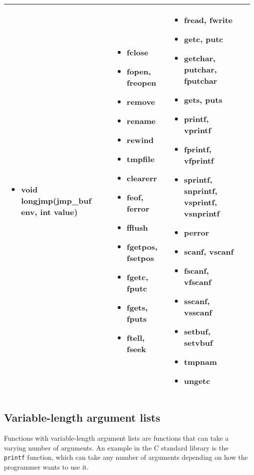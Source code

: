 \begin{table*}[h]
\begin{tabular}{|p{3cm}|p{3cm}|p{3cm}|p{6.5cm}|}
\begin{itemize}
	\item void longjmp(jmp\_buf env, int value)
\end{itemize}
 &  \begin{itemize}
\setlength{\itemsep}{0cm}
\setlength{\parskip}{0cm}
	\item fclose
	\item fopen, freopen
	\item remove
	\item rename
	\item rewind
	\item tmpfile
	\item clearerr
	\item feof, ferror
	\item fflush
	\item fgetpos, fsetpos
	\item fgetc, fputc
	\item fgets, fputs
	\item ftell, fseek
\end{itemize}
 &  \begin{itemize}
\setlength{\itemsep}{0cm}
\setlength{\parskip}{0cm}
	\item fread, fwrite
	\item getc, putc
	\item getchar, putchar, fputchar
	\item gets, puts
	\item printf, vprintf
	\item fprintf, vfprintf
	\item sprintf, snprintf, vsprintf, vsnprintf
	\item perror
	\item scanf, vscanf
	\item fscanf, vfscanf
	\item sscanf, vsscanf
	\item setbuf, setvbuf
	\item tmpnam
	\item ungetc
\end{itemize}
 \\ \hline
	\end{tabular}
\end{table*}

\subsection{Variable-length argument lists}
Functions with variable-length argument lists are functions that can take a
varying number of arguments. An example in the C standard library is the
\texttt{printf} function, which can take any number of arguments depending on
how the programmer wants to use it.

